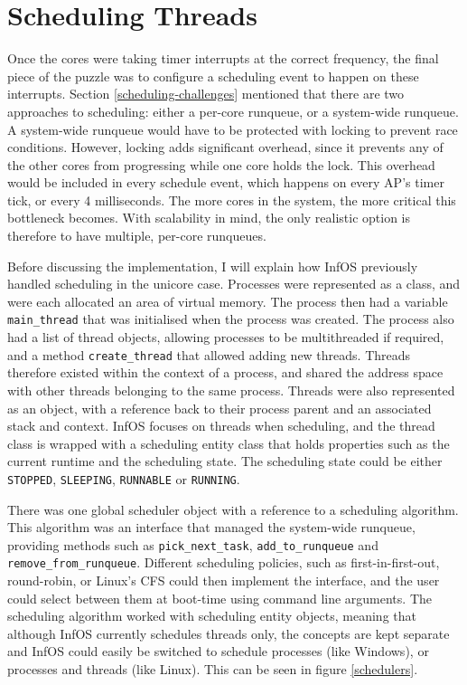 \documentclass[bsc,frontabs,singlespacing,parskip,deptreport]{infthesis}
\begin{document}
\section{Scheduling Threads} \label{scheduling-threads}
Once the cores were taking timer interrupts at the correct frequency, the final piece of the puzzle was to configure a scheduling event to happen on these interrupts. Section \ref{scheduling-challenges} mentioned that there are two approaches to scheduling: either a per-core runqueue, or a system-wide runqueue. A system-wide runqueue would have to be protected with locking to prevent race conditions. However, locking adds significant overhead, since it prevents any of the other cores from progressing while one core holds the lock. This overhead would be included in every schedule event, which happens on every AP's timer tick, or every 4 milliseconds. The more cores in the system, the more critical this bottleneck becomes. With scalability in mind, the only realistic option is therefore to have multiple, per-core runqueues.

Before discussing the implementation, I will explain how InfOS previously handled scheduling in the unicore case. Processes were represented as a class, and were each allocated an area of virtual memory. The process then had a variable \verb|main_thread| that was initialised when the process was created. The process also had a list of thread objects, allowing processes to be multithreaded if required, and a method \verb|create_thread| that allowed adding new threads. Threads therefore existed within the context of a process, and shared the address space with other threads belonging to the same process. Threads were also represented as an object, with a reference back to their process parent and an associated stack and context. InfOS focuses on threads when scheduling, and the thread class is wrapped with a scheduling entity class that holds properties such as the current runtime and the scheduling state. The scheduling state could be either \verb|STOPPED|, \verb|SLEEPING|, \verb|RUNNABLE| or \verb|RUNNING|.

There was one global scheduler object with a reference to a scheduling algorithm. This algorithm was an interface that managed the system-wide runqueue, providing methods such as \texttt{pick\_next\_task}, \texttt{add\_to\_runqueue} and \texttt{remove\_from\_runqueue}. Different scheduling policies, such as first-in-first-out, round-robin, or Linux's CFS could then implement the interface, and the user could select between them at boot-time using command line arguments. The scheduling algorithm worked with scheduling entity objects, meaning that although InfOS currently schedules threads only, the concepts are kept separate and InfOS could easily be switched to schedule processes (like Windows), or processes and threads (like Linux). This can be seen in figure \ref{schedulers}.
\end{document}
